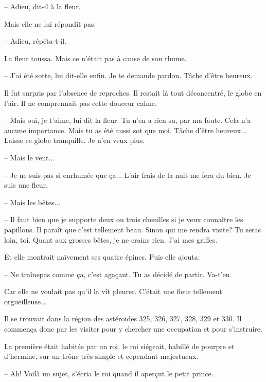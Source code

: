 \documentclass[a4paper]{report}
\begin{document}
-- Adieu, dit-il à la fleur.

Mais elle ne lui répondit pas.

-- Adieu, répéta-t-il.

La fleur toussa. Mais ce n'était pas à cause de son rhume.

-- J'ai été sotte, lui dit-elle enfin. Je te demande pardon. Tâche d'être heureux.

Il fut surpris par l'absence de reproches. Il restait là tout déconcentré, le globe en l'air. Il ne comprennait pas cette douceur calme.

-- Mais oui, je t'aime, lui dit la fleur. Tu n'en a rien su, par ma faute. Cela n'a aucune importance. Mais tu as été aussi sot que moi. Tâche d'être heureux... Laisse ce globe tranquille. Je n'en veux plus.

-- Mais le vent...

-- Je ne suis pas si enrhumée que ça... L'air frais de la nuit me fera du bien. Je suis une fleur.

-- Mais les bêtes...

-- Il faut bien que je supporte deux ou trois chenilles si je veux connaître les papillons. Il paraît que c'est tellement beau. Sinon qui me rendra visite? Tu seras loin, toi. Quant aux grosses bêtes, je ne crains rien. J'ai mes griffes.

Et elle montrait naïvement ses quatre épines. Puis elle ajouta:

-- Ne  traînepas comme ça, c'est agaçant. Tu as décidé de partir. Va-t'en.

Car elle ne voulait pas qu'il la vît pleurer. C'était une fleur tellement orgueilleuse...

\parachapter{} %
Il se trouvait dans la région des astéroïdes 325, 326, 327, 328, 329 et 330. Il commença donc par les visiter pour y chercher une occupation et pour s'instruire.

La première était habitée par un roi. le roi siégeait, habillé de pourpre et d'hermine, sur un trône très simple et cependant majestueux.

-- Ah! Voilà un sujet, s'écria le roi quand il aperçut le petit prince.
\end{document}
